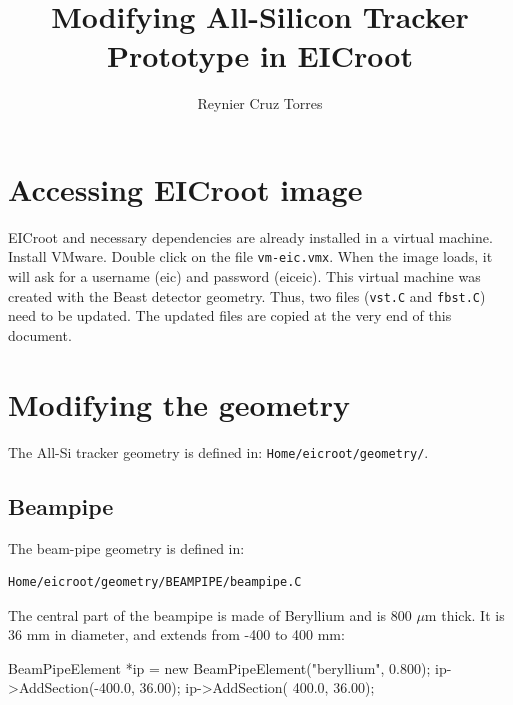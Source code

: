 \documentclass[12pt]{article}
\title{Modifying All-Silicon Tracker Prototype in EICroot}
\author{Reynier Cruz Torres}
\begin{document}
\maketitle


\section{Accessing EICroot image}

EICroot and necessary dependencies are already installed in a virtual machine.
Install VMware.
Double click on the file \verb|vm-eic.vmx|.
When the image loads, it will ask for a username (eic) and password (eiceic).
This virtual machine was created with the Beast detector geometry. Thus, two files (\verb|vst.C| and \verb|fbst.C|) need to be updated.
The updated files are copied at the very end of this document.

\section{Modifying the geometry}

The All-Si tracker geometry is defined in: \verb|Home/eicroot/geometry/|.

\subsection{Beampipe}

The beam-pipe geometry is defined in:

\begin{tcolorbox}
\begin{verbatim}
Home/eicroot/geometry/BEAMPIPE/beampipe.C
\end{verbatim}  
\end{tcolorbox}

The central part of the beampipe is made of Beryllium and is 800 $\mu$m thick.
It is 36 mm in diameter, and extends from -400 to 400 mm:

\begin{tcolorbox}
\begin{verbnobox}[\scriptsize]
BeamPipeElement *ip = new BeamPipeElement("beryllium", 0.800);
ip->AddSection(-400.0, 36.00);
ip->AddSection( 400.0, 36.00);
\end{verbnobox}  
\end{tcolorbox}
\end{document}
